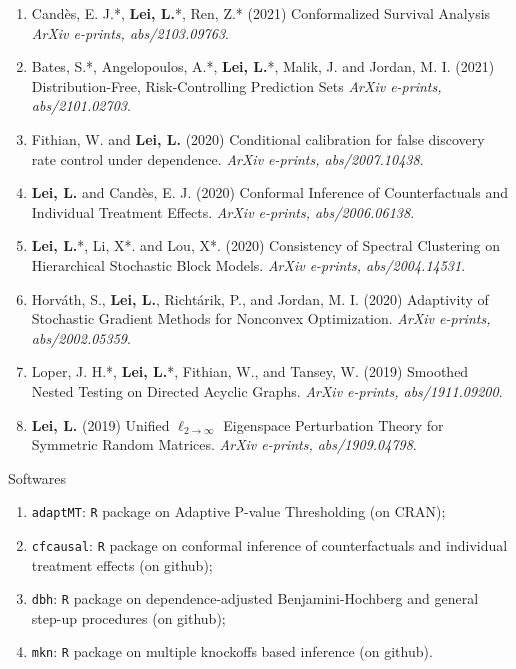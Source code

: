 \documentclass{article}
\begin{document}
\begin{enumerate}
\item Cand\`{e}s, E. J.*, \textbf{Lei, L.}*, Ren, Z.* (2021) Conformalized Survival Analysis \emph{ArXiv e-prints, abs/2103.09763}.
\item Bates, S.*, Angelopoulos, A.*, \textbf{Lei, L.}*, Malik, J. and Jordan, M. I. (2021) Distribution-Free, Risk-Controlling Prediction Sets \emph{ArXiv e-prints, abs/2101.02703}.
\item Fithian, W. and \textbf{Lei, L.} (2020) Conditional calibration for false discovery rate control under dependence. \emph{ArXiv e-prints, abs/2007.10438}.
\item \textbf{Lei, L.} and Cand\`{e}s, E. J. (2020) Conformal Inference of Counterfactuals and Individual Treatment Effects. \emph{ArXiv e-prints, abs/2006.06138}.
\item \textbf{Lei, L.}*, Li, X*. and Lou, X*. (2020) Consistency of Spectral Clustering on Hierarchical Stochastic Block Models. \emph{ArXiv e-prints, abs/2004.14531}.
\item Horv\'{a}th, S., \textbf{Lei, L.}, Richt\'{a}rik, P., and Jordan, M. I. (2020) Adaptivity of Stochastic Gradient Methods for Nonconvex Optimization. \emph{ArXiv e-prints, abs/2002.05359}.
\item Loper, J. H.*, \textbf{Lei, L.}*, Fithian, W., and Tansey, W. (2019) Smoothed Nested Testing on Directed Acyclic Graphs. \emph{ArXiv e-prints, abs/1911.09200}.
\item \textbf{Lei, L.} (2019) Unified $\ell_{2\rightarrow\infty}$ Eigenspace Perturbation Theory for Symmetric Random Matrices. \emph{ArXiv e-prints, abs/1909.04798}.
\end{enumerate}

\begin{large}
\noindent Softwares 
\end{large}

\begin{enumerate}
\item \texttt{adaptMT}: \texttt{R} package on Adaptive P-value Thresholding (on CRAN);
\item \texttt{cfcausal}: \texttt{R} package on conformal inference of counterfactuals and individual treatment effects (on github);
\item \texttt{dbh}: \texttt{R} package on dependence-adjusted Benjamini-Hochberg and general step-up procedures (on github);
\item \texttt{mkn}: \texttt{R} package on multiple knockoffs based inference (on github).
\end{enumerate}
\end{document}
